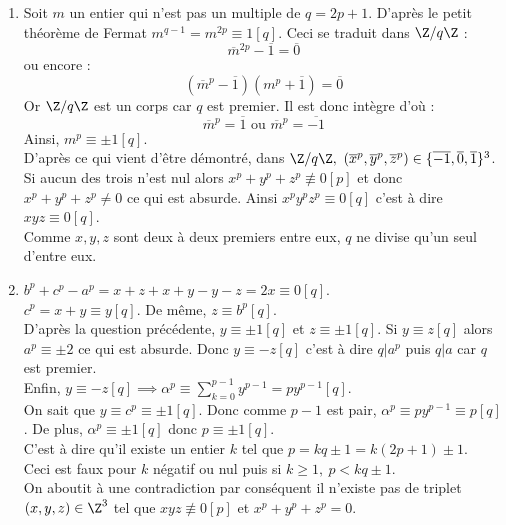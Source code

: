 \documentclass[8pt]{book}
\begin{document}
\begin{enumerate}[leftmargin=*]
\begin{enumerate}[label=\alph*.]
			Donc $r=p$ mais alors $-x^p=(y+z)\displaystyle\sum_{k=0}^{p-1}(-z)^{p-1-k}y^k\equiv 0[p]$. Donc $p|-x^p$ puis $p|x$ et $xyz\equiv 0[p]$ ce qui est absurde.\\
			Ainsi $y+z$ et $\displaystyle\sum_{k=0}^{p-1}(-z)^{p-1-k}y^k$ n'ont pas de diviseurs premiers commun : ils sont donc premiers entre eux. La question précédente assure alors l'existence de deux entiers $a$ et $\alpha$ tels que $y+z=a^p$ et $\displaystyle\sum_{k=0}^{p-1}(-z)^{p-1-k}y^k=\alpha^p$.\\
			En réitérant le même raisonnement en isolant $z$ puis $y$ dans $x^p+y^p+z^p=0$ on obtient de même qu'il existe deux entiers $b$ et $c$ tels que $x+y=c^p$ et $x+z=b^p$.
		\end{enumerate}
		\item Soit $m$ un entier qui n'est pas un multiple de $q=2p+1$. D'après le petit théorème de Fermat $m^{q-1}=m^{2p}\equiv 1[q]$. Ceci se traduit dans $\Z/q\Z$ :
		$$\overline m^{2p}-\overline 1=\overline 0$$
		ou encore :
		$$\left(\overline m^p-\overline 1\right)\left(m^p+\overline 1\right)=\overline 0$$
		Or $\Z/q\Z$ est un corps car $q$ est premier. Il est donc intègre d'où :
		$$\overline m^p=\overline 1 \text{ ou } \overline m^p=\overline{-1}$$
		Ainsi, $m^p\equiv\pm 1[q]$.\\
		D'après ce qui vient d'être démontré, dans $\Z/q\Z,\ (\overline x^p,\overline y^p,\overline z^p)\in \{\overline{-1},\overline 0,\overline 1\}^3$.\\
		Si aucun des trois n'est nul alors $x^p+y^p+z^p\not \equiv 0[p]$ et donc $x^p+y^p+z^p\ne 0$ ce qui est absurde. Ainsi $x^py^pz^p\equiv 0[q]$ c'est à dire $xyz\equiv 0[q]$.\\
		Comme $x,y,z$ sont deux à deux premiers entre eux, $q$ ne divise qu'un seul d'entre eux.
		\item $b^p+c^p-a^p=x+z+x+y-y-z=2x\equiv 0[q]$.\\
		$c^p=x+y\equiv y[q]$. De même, $z\equiv b^p[q]$.\\ D'après la question précédente, $y\equiv\pm 1[q]$ et $z\equiv\pm 1[q]$. Si $y\equiv z[q]$ alors $a^p\equiv \pm 2$ ce qui est absurde. Donc $y\equiv-z[q]$ c'est à dire $q|a^p$ puis $q|a$ car $q$ est premier.\\
		Enfin, $y\equiv-z[q]\implies \alpha^p\equiv\displaystyle\sum_{k=0}^{p-1}y^{p-1}=py^{p-1}[q]$.\\
		On sait que $y\equiv c^p\equiv\pm 1[q]$. Donc comme $p-1$ est pair, $\alpha^p\equiv py^{p-1}\equiv p[q]$. De plus, $\alpha^p\equiv\pm 1[q]$ donc $p\equiv\pm 1[q]$.\\
		C'est à dire qu'il existe un entier $k$ tel que $p=kq\pm 1=k(2p+1)\pm 1$.\\
		Ceci est faux pour $k$ négatif ou nul puis si $k\geq 1,\ p<kq\pm 1$.\\
		On aboutit à une contradiction par conséquent il n'existe pas de triplet $(x,y,z)\in \Z^3$ tel que $xyz\not\equiv 0[p]$ et $x^p+y^p+z^p=0$.
	\end{enumerate}
\end{document}
